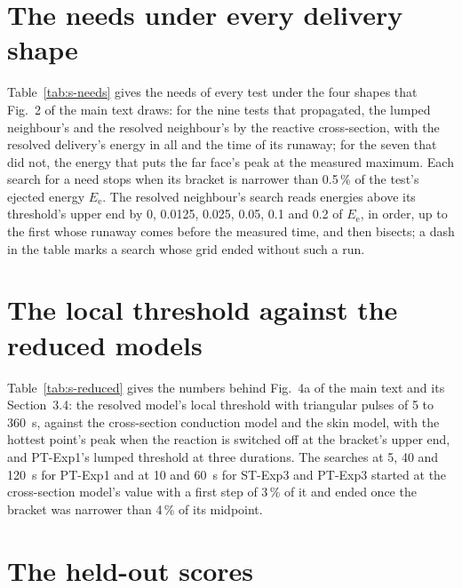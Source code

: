 \documentclass[preprint,12pt]{elsarticle}
\begin{document}
\section{The needs under every delivery shape}
\label{sec:s-needs}

Table~\ref{tab:s-needs} gives the needs of every test under the four shapes that Fig.~2 of the main text draws: for the nine tests that propagated, the lumped neighbour's and the resolved neighbour's by the reactive cross-section, with the resolved delivery's energy in all and the time of its runaway; for the seven that did not, the energy that puts the far face's peak at the measured maximum. Each search for a need stops when its bracket is narrower than 0.5\,\% of the test's ejected energy $E_\mathrm{e}$. The resolved neighbour's search reads energies above its threshold's upper end by 0, 0.0125, 0.025, 0.05, 0.1 and 0.2 of $E_\mathrm{e}$, in order, up to the first whose runaway comes before the measured time, and then bisects; a dash in the table marks a search whose grid ended without such a run.


\section{The local threshold against the reduced models}
\label{sec:s-reduced}

Table~\ref{tab:s-reduced} gives the numbers behind Fig.~4a of the main text and its Section~3.4: the resolved model's local threshold with triangular pulses of 5 to 360~s, against the cross-section conduction model and the skin model, with the hottest point's peak when the reaction is switched off at the bracket's upper end, and PT-Exp1's lumped threshold at three durations. The searches at 5, 40 and 120~s for PT-Exp1 and at 10 and 60~s for ST-Exp3 and PT-Exp3 started at the cross-section model's value with a first step of 3\,\% of it and ended once the bracket was narrower than 4\,\% of its midpoint.



\section{The held-out scores}
\label{sec:s-heldout}
\end{document}
